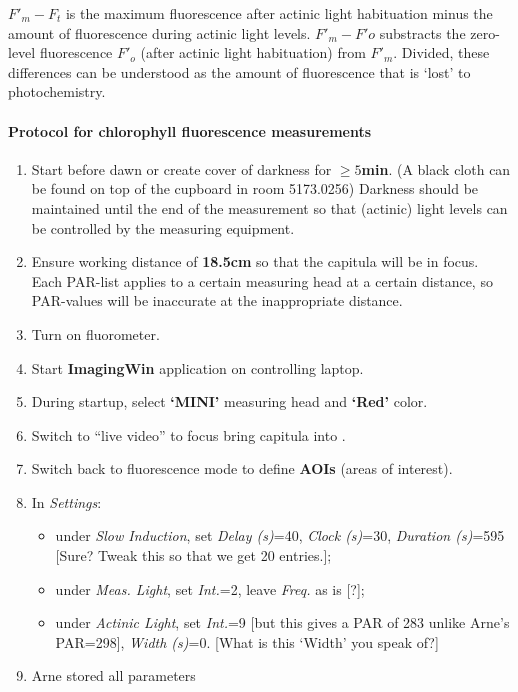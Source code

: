 \documentclass[12pt,a4paper,draft]{article}\usepackage[]{graphicx}\usepackage[]{color}
\begin{document}
$F'_m - F_t$ is the maximum fluorescence after actinic light habituation minus the amount of fluorescence during actinic light levels. $F'_m - F'o$ substracts the zero-level fluorescence $F'_o$ (after actinic light habituation) from $F'_m$. Divided, these differences can be understood as the amount of fluorescence that is `lost' to photochemistry.

\paragraph{Protocol for chlorophyll fluorescence measurements}

\begin{enumerate}
\item Start before dawn or create cover of darkness for \textbf{$\ge 5$min}. (A black cloth can be found on top of the cupboard in room 5173.0256) Darkness should be maintained until the end of the measurement so that (actinic) light levels can be controlled by the measuring equipment.
\item Ensure working distance of \textbf{18.5cm} so that the capitula will be in focus. Each PAR-list applies to a certain measuring head at a certain distance, so PAR-values will be inaccurate at the inappropriate distance.
\item Turn on fluorometer.
\item Start \textbf{ImagingWin} application on controlling laptop.
\item During startup, select \textbf{`MINI'} measuring head and \textbf{`Red'} color.
\item Switch to ``live video'' to focus bring capitula into .
\item Switch back to fluorescence mode to define \textbf{AOIs} (areas of interest).
\item In \textit{Settings}:
\begin{itemize}
\item under \textit{Slow Induction}, set \textit{Delay (s)}=40, \textit{Clock (s)}=30, \textit{Duration (s)}=595 [Sure? Tweak this so that we get 20 entries.];
\item under \textit{Meas. Light}, set \textit{Int.}=2, leave \textit{Freq.} as is [?];
\item under \textit{Actinic Light}, set \textit{Int.}=9 [but this gives a PAR of 283 unlike Arne's PAR=298], \textit{Width (s)}=0. [What is this `Width' you speak of?]
\end{itemize}
\item Arne stored all parameters
\end{enumerate}
 
\end{document}
